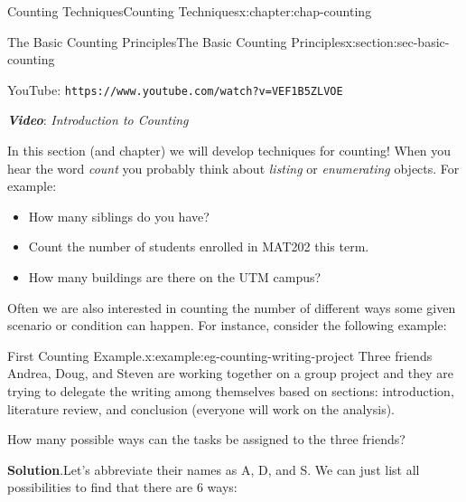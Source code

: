 \documentclass[oneside,10pt,]{book}
\newcommand{\blocktitlefont}{\relax}
\newcommand{\tabularfont}{\relax}
\newcommand{\mono}[1]{\texttt{#1}}
\newcommand{\alert}[1]{\textbf{\textit{#1}}}
\numberwithin{equation}{section}
\newlength{\qrsize}
\newlength{\previewwidth}
\begin{document}
\begin{chapterptx}{Counting Techniques}{}{Counting Techniques}{}{}{x:chapter:chap-counting}
\begin{sectionptx}{The Basic Counting Principles}{}{The Basic Counting Principles}{}{}{x:section:sec-basic-counting}
\begin{sidebyside}{1}{0}{0}{0}
\begin{sbspanel}{1}
\begin{tcbraster}[raster columns=2, raster column skip=1pt, raster halign=center, raster force size=false, raster left skip=0pt, raster right skip=0pt]
\begin{tcolorbox}[previewstyle, width=\previewwidth]
\end{tcolorbox}%
\begin{tcolorbox}[qrstyle]%
{\hypersetup{urlcolor=black}}%
\end{tcolorbox}%
\begin{tcolorbox}[captionstyle]%
\small YouTube: \mono{https://www.youtube.com/watch?v=VEF1B5ZLVOE}\end{tcolorbox}%
\end{tcbraster}%
\end{sbspanel}%
\end{sidebyside}%
\par
\alert{Video}: \emph{Introduction to Counting}%
\par
In this section (and chapter) we will develop techniques for counting! When you hear the word \emph{count} you probably think about \emph{listing} or \emph{enumerating} objects. For example:%
\begin{itemize}[label=\textbullet]
\item{}How many siblings do you have?%
\item{}Count the number of students enrolled in MAT202 this term.%
\item{}How many buildings are there on the UTM campus?%
\end{itemize}
Often we are also interested in counting the number of different ways some given scenario or condition can happen. For instance, consider the following example:%
\begin{example}{First Counting Example.}{x:example:eg-counting-writing-project}%
Three friends Andrea, Doug, and Steven are working together on a group project and they are trying to delegate the writing among themselves based on sections: introduction, literature review, and conclusion (everyone will work on the analysis).%
\par
How many possible ways can the tasks be assigned to the three friends?%
\par\smallskip%
\noindent\textbf{\blocktitlefont Solution}.\hypertarget{g:solution:id522441}{}\quad{}Let's abbreviate their names as A, D, and S. We can just list all possibilities to find that there are 6 ways:%
\begin{sidebyside}{1}{0.2}{0.2}{0}%
\begin{sbspanel}{0.6}%
\resizebox{\linewidth}{!}{%
{\centering%
{\tabularfont%
\begin{tabular}{lllllll}
\multicolumn{1}{lB}{Introduction}&A&A&D&D&S&S\tabularnewline[0pt]

\end{tabular}}}}
\end{sbspanel}
\end{sidebyside}
\end{example}
\end{sectionptx}
\end{chapterptx}
\end{document}
